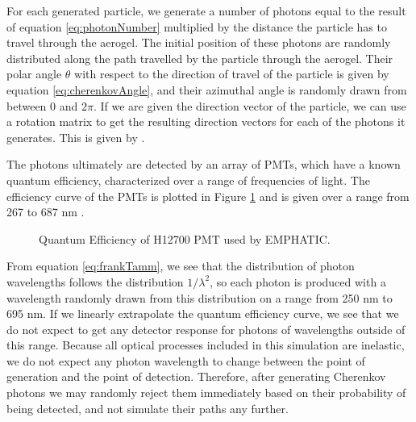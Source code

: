 For each generated particle, we generate a number of photons equal to the result of equation \ref{eq:photonNumber} multiplied by the distance the particle has to travel through the aerogel.
The initial position of these photons are randomly distributed along the path travelled by the particle through the aerogel.
Their polar angle $\theta$ with respect to the direction of travel of the particle is given by equation \ref{eq:cherenkovAngle}, and their azimuthal angle is randomly drawn from between 0 and $2\pi$.
If we are given the direction vector of the particle, we can use a rotation matrix to get the resulting direction vectors for each of the photons it generates.
This is given by .

The photons ultimately are detected by an array of PMTs, which have a known quantum efficiency, characterized over a range of frequencies of light.
The efficiency curve of the PMTs is plotted in Figure \ref{fig:qEff} and is given over a range from 267 to 687 nm   .

\begin{figure}[]
\centering
{}
\caption[Quantum Efficiency of H12700 PMT used by EMPHATIC.]{Quantum Efficiency of H12700 PMT used by EMPHATIC.}
\label{fig:qEff} 
\end{figure}

From equation \ref{eq:frankTamm}, we see that the distribution of photon wavelengths follows the distribution $1/\lambda^2$, so each photon is produced with a wavelength randomly drawn from this distribution on a range from 250 nm to 695 nm.
If we linearly extrapolate the quantum efficiency curve, we see that we do not expect to get any detector response for photons of wavelengths outside of this range.
Because all optical processes included in this simulation are inelastic, we do not expect any photon wavelength to change between the point of generation and the point of detection.
Therefore, after generating Cherenkov photons we may randomly reject them immediately based on their probability of being detected, and not simulate their paths any further.

